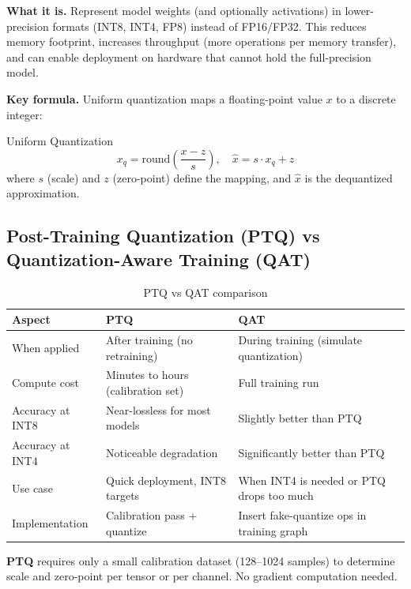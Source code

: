\textbf{What it is.} Represent model weights (and optionally activations) in lower-precision formats (INT8, INT4, FP8) instead of FP16/FP32. This reduces memory footprint, increases throughput (more operations per memory transfer), and can enable deployment on hardware that cannot hold the full-precision model.

\textbf{Key formula.} Uniform quantization maps a floating-point value $x$ to a discrete integer:

\begin{mathresult}{Uniform Quantization}
\begin{equation}
x_q = \text{round}\!\left(\frac{x - z}{s}\right), \quad \hat{x} = s \cdot x_q + z
\end{equation}
where $s$ (scale) and $z$ (zero-point) define the mapping, and $\hat{x}$ is the dequantized approximation.
\end{mathresult}

\subsection{Post-Training Quantization (PTQ) vs Quantization-Aware Training (QAT)}

\begin{table}[H]
\centering
\caption{PTQ vs QAT comparison}
\begin{tabularx}{\textwidth}{lXX}
\toprule
\textbf{Aspect} & \textbf{PTQ} & \textbf{QAT} \\
\midrule
When applied & After training (no retraining) & During training (simulate quantization) \\
Compute cost & Minutes to hours (calibration set) & Full training run \\
Accuracy at INT8 & Near-lossless for most models & Slightly better than PTQ \\
Accuracy at INT4 & Noticeable degradation & Significantly better than PTQ \\
Use case & Quick deployment, INT8 targets & When INT4 is needed or PTQ drops too much \\
Implementation & Calibration pass + quantize & Insert fake-quantize ops in training graph \\
\bottomrule
\end{tabularx}
\end{table}

\textbf{PTQ} requires only a small calibration dataset (128--1024 samples) to determine scale and zero-point per tensor or per channel. No gradient computation needed.

